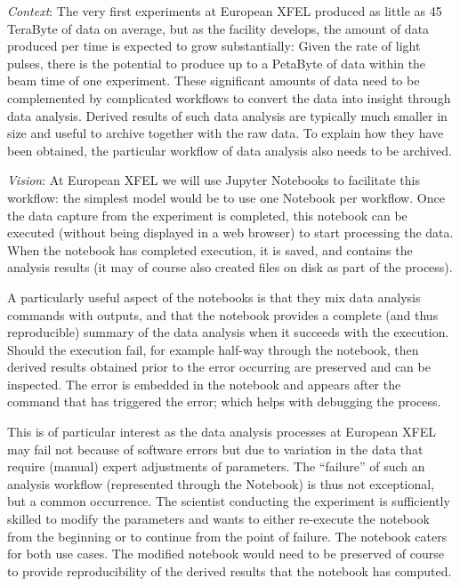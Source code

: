 \begin{task}[
  title=Reproducible X-ray crystallography workflows at European XFEL,
  id=reproducibility-xfel,
  lead=XFEL,
  PM=36,
  wphases={6-48},
  partners={XFEL}
  ]
  \medskip \emph{Context}: The very first experiments at European XFEL
  produced as little as 45 TeraByte of data on average, but as the
  facility develops, the amount of data produced per time is expected
  to grow substantially: Given the rate of light pulses, there is the
  potential to produce up to a PetaByte of data within the beam time
  of one experiment. These significant amounts of data need to be
  complemented by complicated workflows to convert the data into
  insight through data analysis. Derived results of such data analysis
  are typically much smaller in size and useful to archive together
  with the raw data. To explain how they have been obtained, the
  particular workflow of data analysis also needs to be archived.

  \medskip \emph{Vision}: At European XFEL we will use Jupyter Notebooks to facilitate
  this workflow: the simplest model would be to use one Notebook per
  workflow. Once the data capture from the experiment is completed,
  this notebook can be executed (without being displayed in a web
  browser) to start processing the data. When the notebook has
  completed execution, it is saved, and contains the analysis results
  (it may of course also created files on disk as part of the
  process).

  A particularly useful aspect of the notebooks is that they mix data
  analysis commands with outputs, and that the notebook provides a
  complete (and thus reproducible) summary of the data analysis when
  it succeeds with the execution. Should the execution fail, for
  example half-way through the notebook, then derived results obtained
  prior to the error occurring are preserved and can be inspected. The
  error is embedded in the notebook and appears after the command that
  has triggered the error; which helps with debugging the process.

  This is of particular interest as the data analysis processes at
  European XFEL may fail not because of software errors but due to
  variation in the data that require (manual) expert adjustments of
  parameters. The ``failure'' of such an analysis workflow
  (represented through the Notebook) is thus not exceptional, but a
  common occurrence. The scientist conducting the experiment is
  sufficiently skilled to modify the parameters and wants to either
  re-execute the notebook from the beginning or to continue from the
  point of failure. The notebook caters for both use cases. The
  modified notebook would need to be preserved of course to provide
  reproducibility of the derived results that the notebook has
  computed.


\end{task}
